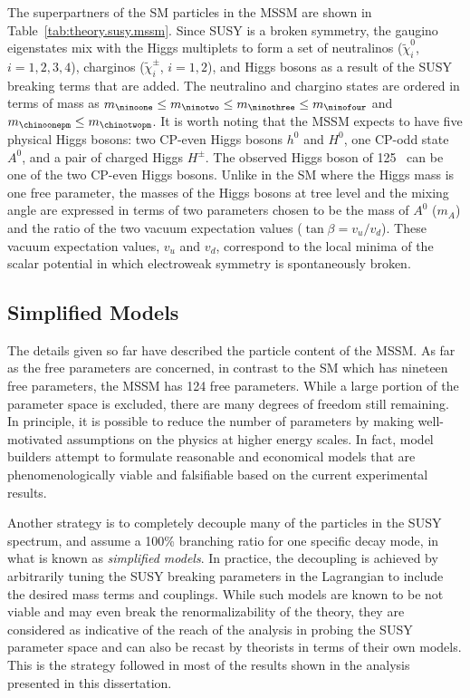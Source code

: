 The superpartners of the SM particles in the MSSM are shown in Table~\ref{tab:theory.susy.mssm}.
Since SUSY is a broken symmetry, the gaugino eigenstates mix with the Higgs multiplets to form a set of 
neutralinos ($\tilde{\chi}_{i}^{0}$, $i=1,2,3,4$), charginos ($\tilde{\chi}_{i}^{\pm}$, $i=1,2$), and Higgs bosons 
as a result of the SUSY breaking terms that are added. 
The neutralino and chargino states are ordered in terms of mass as
$m_{\ninoone} \leq m_{\ninotwo} \leq m_{\ninothree} \leq m_{\ninofour}$ and $m_{\chinoonepm} \leq m_{\chinotwopm}$.
It is worth noting that the MSSM expects to have five physical Higgs bosons: two CP-even Higgs bosons
$h^0$ and $H^0$, one CP-odd state $A^0$, and a pair of charged Higgs $H^\pm$. The observed Higgs boson of
125 \GeV~can be one of the two CP-even Higgs bosons. Unlike in the SM where the Higgs mass is one free parameter, 
the masses of the Higgs bosons at tree level and the mixing angle are expressed in terms of 
two parameters chosen to be the mass of $A^0$ ($m_A$) and the ratio of the two vacuum expectation values
($\tan \beta = v_u/v_d$). These vacuum expectation values, $v_u$ and $v_d$, correspond to the local minima 
of the scalar potential in which electroweak symmetry is spontaneously broken.

\subsection*{Simplified Models}

The details given so far have described the particle content of the MSSM. 
As far as the free parameters are concerned, in contrast to the SM which has 
nineteen free parameters, the MSSM has 124 free parameters. While a large portion of the 
parameter space is excluded, there are many degrees of freedom still remaining.
In principle, it is possible to reduce the number of parameters by making well-motivated assumptions
on the physics at higher energy scales. In fact, model builders attempt to formulate reasonable and 
economical models that are phenomenologically viable and falsifiable based on the current experimental results.

Another strategy is to completely decouple many of the particles in the SUSY spectrum, and assume a 100\% 
branching ratio for one specific decay mode, in what is known as \textit{simplified models}.
 In practice, the decoupling is achieved by arbitrarily 
tuning the SUSY breaking parameters in the Lagrangian to include the desired mass terms and couplings.
While such models are known to be not viable and may even 
break the renormalizability of the theory, they are considered as indicative  
of the reach of the analysis in probing the SUSY parameter space and can also be recast by theorists in terms 
of their own models. This is the strategy followed in most of the results shown in the analysis presented in this 
dissertation.


